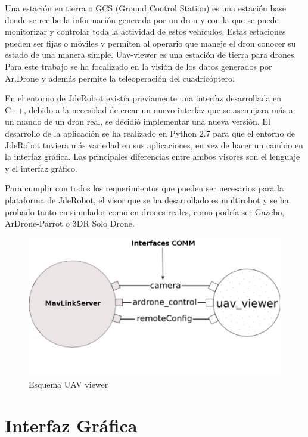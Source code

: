 \label{visor uavViewer}

Una estación en tierra o GCS (Ground Control Station) es una estación base donde se recibe la
información generada por un dron y con la que se puede monitorizar y controlar toda la actividad
de estos vehículos. Estas estaciones pueden ser fijas o móviles y permiten al operario que maneje el dron
conocer su estado de una manera simple. Uav-viewer es una estación de tierra para drones. Para este
trabajo se ha focalizado en la visión de los datos generados por Ar.Drone y además permite la teleoperación
del cuadricóptero. 

En el entorno de JdeRobot existía previamente una interfaz desarrollada en C++, debido a la necesidad de crear un nuevo interfaz que se asemejara más a un mando de un dron real, se decidió implementar una nueva versión. El desarrollo de la aplicación se ha realizado en Python 2.7 para que el entorno de JdeRobot tuviera más variedad en sus aplicaciones, en vez de hacer un cambio en la interfaz gráfica. Las principales diferencias entre ambos visores son el lenguaje y el interfaz gráfico. 

Para cumplir con todos los requerimientos que pueden ser necesarios para la plataforma de JdeRobot, el visor que se ha desarrollado es multirobot y se ha probado tanto en simulador como en drones reales, como podría ser Gazebo, ArDrone-Parrot o 3DR Solo Drone.

\begin{figure}[H]
  \centering
  \includegraphics[scale=0.4]{imagenes/Mapageneral.png}
  \caption{Esquema UAV viewer}
  \label{fig:esquemaUav}
\end{figure}

\section{Interfaz Gráfica}

